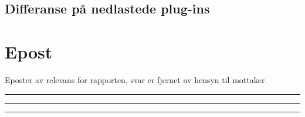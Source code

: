 \documentclass[a4paper,twoside,11pt,pdftex,norsk]{report}
\newenvironment{changemargin}[2]{%
\begin{list}{}{%
\linespread{0.9}%
\setlength{\topsep}{0pt}%
\setlength{\leftmargin}{#1}%
\setlength{\rightmargin}{#2}%
\setlength{\listparindent}{\parindent}%
\setlength{\itemindent}{\parindent}%
\setlength{\parsep}{\parskip}%
}%
\item[]}{\end{list}}
\begin{document}
\begin{appendices}
\begin{changemargin}{-1cm}{-1cm}
\section{Differanse på nedlastede plug-ins}

\end{changemargin}

\chapter{Epost}\label{epost}
Eposter av relevans for rapporten, svar er fjernet av hensyn til mottaker.
\clearpage

\noindent\rule{\textwidth}{0.4pt}

\noindent\rule{\textwidth}{0.4pt}

\clearpage

\noindent\rule{\textwidth}{0.4pt}
\label{app:maildb}
\clearpage

\clearpage
{}
\end{appendices}
\end{document}
